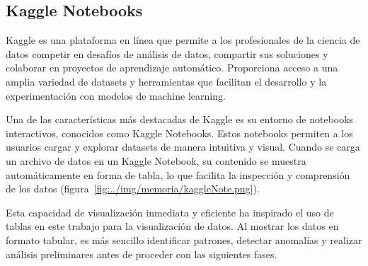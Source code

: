 \subsection{Kaggle Notebooks}
Kaggle es una plataforma en línea que permite a los profesionales de la ciencia de datos competir en desafíos de análisis de datos, compartir sus soluciones y colaborar en proyectos de aprendizaje automático. Proporciona acceso a una amplia variedad de datasets y herramientas que facilitan el desarrollo y la experimentación con modelos de machine learning.

Una de las características más destacadas de Kaggle es su entorno de notebooks interactivos, conocidos como Kaggle Notebooks. Estos notebooks permiten a los usuarios cargar y explorar datasets de manera intuitiva y visual. Cuando se carga un archivo de datos en un Kaggle Notebook, su contenido se muestra automáticamente en forma de tabla, lo que facilita la inspección y comprensión de los datos (figura~\ref{fig:../img/memoria/kaggleNote.png}).


Esta capacidad de visualización inmediata y eficiente ha inspirado el uso de tablas en este trabajo para la visualización de datos. Al mostrar los datos en formato tabular, es más sencillo identificar patrones, detectar anomalías y realizar análisis preliminares antes de proceder con las siguientes fases. 